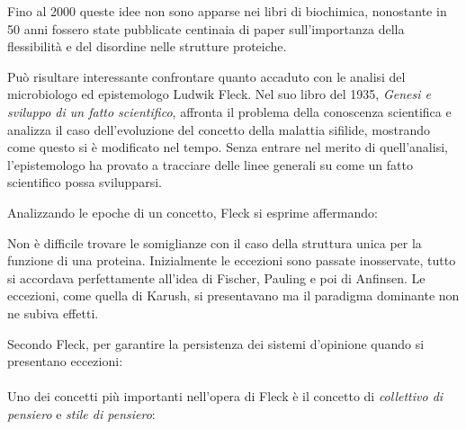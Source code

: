 {\par Fino al 2000\supercite{bracken2000disorder} queste idee non sono apparse nei libri di biochimica, nonostante in 50 anni fossero state pubblicate centinaia di paper sull'importanza della flessibilità e del disordine nelle strutture proteiche.

\par Può risultare interessante confrontare quanto accaduto con le analisi del microbiologo ed epistemologo Ludwik Fleck\supercite{fleck_1983}. Nel suo libro del 1935, \textit{Genesi e sviluppo di un fatto scientifico}, affronta il problema della conoscenza scientifica e analizza il caso dell'evoluzione del concetto della malattia sifilide, mostrando come questo si è modificato nel tempo. Senza entrare nel merito di quell'analisi, l'epistemologo ha provato a tracciare delle linee generali su come un fatto scientifico possa svilupparsi.

\par Analizzando le epoche di un concetto, Fleck si esprime affermando:\\

Non è difficile trovare le somiglianze con il caso della struttura unica per la funzione di una proteina. Inizialmente le eccezioni sono passate inosservate, tutto si accordava perfettamente all'idea di Fischer, Pauling e poi di Anfinsen. Le eccezioni, come quella di Karush, si presentavano ma il paradigma dominante non ne subiva effetti.

Secondo Fleck, per garantire la persistenza dei sistemi d'opinione quando si presentano eccezioni:\\
\\

Uno dei concetti più importanti nell'opera di Fleck è il concetto di \textit{collettivo di pensiero} e \textit{stile di pensiero}:\\

}
